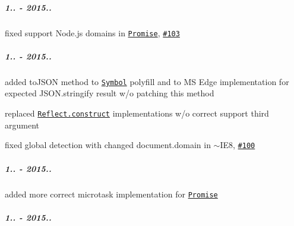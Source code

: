 \subparagraph*{1.. -\/ 2015..}


\begin{DoxyItemize}
\item fixed support Node.\+js domains in \href{https://github.com/zloirock/core-js/#ecmascript-6-promise}{\tt {\ttfamily Promise}}, \href{https://github.com/zloirock/core-js/issues/103}{\tt \#103}
\end{DoxyItemize}

\subparagraph*{1.. -\/ 2015..}


\begin{DoxyItemize}
\item added {\ttfamily to\+J\+S\+ON} method to \href{https://github.com/zloirock/core-js/#ecmascript-6-symbol}{\tt {\ttfamily Symbol}} polyfill and to MS Edge implementation for expected {\ttfamily J\+S\+O\+N.\+stringify} result w/o patching this method
\item replaced \href{https://github.com/zloirock/core-js/#ecmascript-6-reflect}{\tt {\ttfamily Reflect.\+construct}} implementations w/o correct support third argument
\item fixed {\ttfamily global} detection with changed {\ttfamily document.\+domain} in $\sim$\+I\+E8, \href{https://github.com/zloirock/core-js/issues/100}{\tt \#100}
\end{DoxyItemize}

\subparagraph*{1.. -\/ 2015..}


\begin{DoxyItemize}
\item added more correct microtask implementation for \href{#ecmascript-6-promise}{\tt {\ttfamily Promise}}
\end{DoxyItemize}

\subparagraph*{1.. -\/ 2015..}


